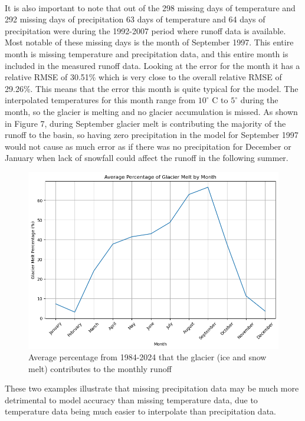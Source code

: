 \documentclass{article}
\begin{document}
\paragraph{}
It is also important to note that out of the 298 missing days of temperature and 292 missing days of precipitation 63 days of temperature and 64 
days of precipitation were during the 1992-2007 period where runoff data is available. Most notable of these missing days is the month of September 
1997. This entire month is missing temperature and precipitation data, and this entire month is included in the measured runoff data. Looking at the 
error for the month it has a relative RMSE of 30.51\% which is very close to the overall relative RMSE of 29.26\%. This 
means that the error this month is quite typical for the model. The interpolated temperatures for this month range from $10^\circ$ C to $5^\circ$ 
during the month, so the glacier is melting and no glacier accumulation is missed. As shown in Figure 7, during September glacier melt is 
contributing the majority of the runoff to the basin, so having zero precipitation in the model for September 1997 would not cause as much error as 
if there was no precipitation for December or January when lack of snowfall could affect the runoff in the following summer.
\begin{figure}[h!]
    \centering
    \includegraphics[width=\textwidth]{Plots/percent_glac_melt_month.png}
    \caption{Average percentage from 1984-2024 that the glacier (ice and snow melt) contributes to the monthly runoff}
    \label{fig:percent_glacier_runoff}
\end{figure}
\FloatBarrier
These two examples illustrate that missing precipitation data may be much more detrimental to model accuracy than missing temperature data, 
due to temperature data being much easier to interpolate than precipitation data.
\end{document}
